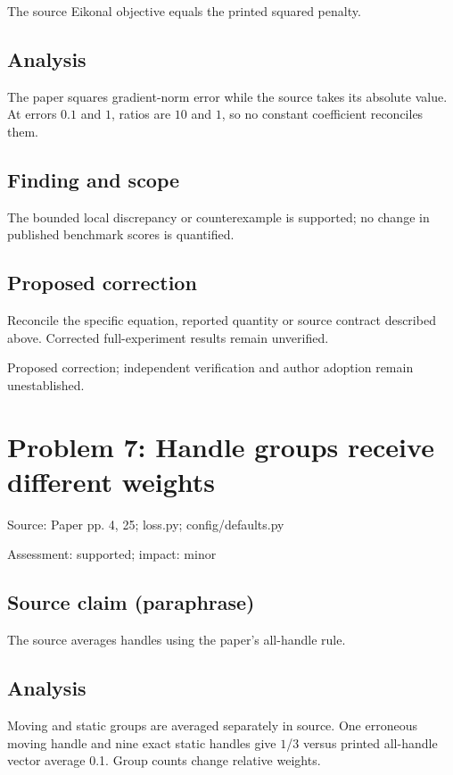 \documentclass[11pt]{article}
\begin{document}
The source Eikonal objective equals the printed squared penalty.

\subsection*{Analysis}

The paper squares gradient-norm error while the source takes its absolute value. At errors \(0.1\) and \(1\), ratios are \(10\) and \(1\), so no constant coefficient reconciles them.

\subsection*{Finding and scope}

The bounded local discrepancy or counterexample is supported; no change in published benchmark scores is quantified.

\subsection*{Proposed correction}

Reconcile the specific equation, reported quantity or source contract described above. Corrected full-experiment results remain unverified.

Proposed correction; independent verification and author adoption remain unestablished.

\section*{Problem 7: Handle groups receive different weights}

Source: Paper pp. 4, 25; loss.py; config/defaults.py

Assessment: supported; impact: minor

\subsection*{Source claim (paraphrase)}

The source averages handles using the paper’s all-handle rule.

\subsection*{Analysis}

Moving and static groups are averaged separately in source. One erroneous moving handle and nine exact static handles give \(1\)/\(3\) versus printed all-handle vector average 0.1. Group counts change relative weights.
\end{document}
